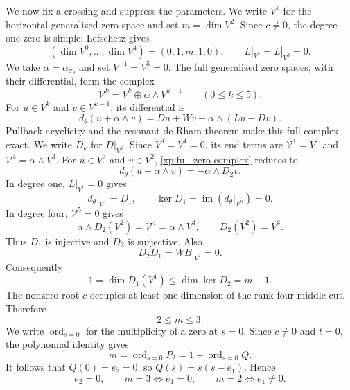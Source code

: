 \documentclass[11pt,letterpaper,reqno]{amsart}
\theoremstyle{remark}
\newcommand{\cV}{\mathcal V}
\begin{document}
We now fix a crossing and suppress the parameters. We write $V^k$ for
the horizontal generalized zero space and set $m=\dim V^2$.
Since $c\ne0$, the degree-one zero is simple; Lefschetz gives
\[
 (\dim V^0,\ldots,\dim V^4)=(0,1,m,1,0),
 \qquad L|_{V^1}=L|_{V^3}=0.
\]
We take $\alpha=\alpha_{\sigma_\theta}$ and set $V^{-1}=V^5=0$.
The full generalized zero spaces, with their differential, form the complex
\[
 \cV^k=V^k\oplus\alpha\wedge V^{k-1}\qquad(0\leq k\leq5).
\]
For $u\in V^k$ and $v\in V^{k-1}$, its differential is
\begin{equation}\label{xp:full-zero-complex}
 d_\theta(u+\alpha\wedge v)
   =Du+Wv+\alpha\wedge(Lu-Dv).
\end{equation}
Pullback acyclicity and the resonant de Rham theorem
\cite[Theorem 2.1]{DR} make this full complex exact. We write $D_k$
for $D|_{V^k}$. Since $V^0=V^4=0$, its end terms are
$\cV^1=V^1$ and $\cV^4=\alpha\wedge V^3$. For
$u\in V^3$ and $v\in V^2$, \eqref{xp:full-zero-complex} reduces to
\[
 d_\theta(u+\alpha\wedge v)=-\alpha\wedge D_2v.
\]
In degree one, $L|_{V^1}=0$ gives
\[
 d_\theta|_{\cV^1}=D_1,\qquad
 \ker D_1=\operatorname{im}(d_\theta|_{\cV^0})=0.
\]
In degree four, $\cV^5=0$ gives
\[
 \alpha\wedge D_2(V^2)=\cV^4=\alpha\wedge V^3,
 \qquad D_2(V^2)=V^3.
\]
Thus $D_1$ is injective and $D_2$ is surjective. Also
\[
 D_2D_1=WB|_{V^1}=0.
\]
Consequently
\[
 1=\dim D_1(V^1)\leq\dim\ker D_2=m-1.
\]
The nonzero root $c$ occupies at least one dimension of the rank-four
middle cut. Therefore
\[
 2\leq m\leq3.
\]
We write $\operatorname{ord}_{s=0}$ for the multiplicity of a zero at
$s=0$. Since $c\ne0$ and $t=0$, the polynomial identity gives
\[
 m=\operatorname{ord}_{s=0}P_2
   =1+\operatorname{ord}_{s=0}Q.
\]
It follows that $Q(0)=e_2=0$, so $Q(s)=s(s-e_1)$. Hence
\begin{equation}\label{two}
 e_2=0,\qquad m=3\Longleftrightarrow e_1=0,
 \qquad m=2\Longleftrightarrow e_1\ne0.
\end{equation}
\end{document}
